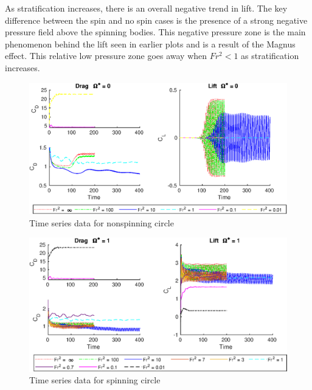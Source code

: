 As stratification increases, there is an overall negative trend in lift. The key difference between the spin and no spin cases is the presence of a strong negative pressure field above the spinning bodies. This negative pressure zone is the main phenomenon behind the lift seen in earlier plots and is a result of the Magnus effect. This relative low pressure zone goes away when $Fr^2 < 1$ as stratification increases. 
\begin{figure}
    \centerline{\includegraphics[width=\textwidth]{images/circle/timens.eps}}
    \caption{Time series data for nonspinning circle}
    \label{fig:timens}
\end{figure}
\begin{figure}
    \centerline{\includegraphics[width=\textwidth]{images/circle/times.eps}}
    \caption{Time series data for spinning circle}
    \label{fig:times}
\end{figure}

